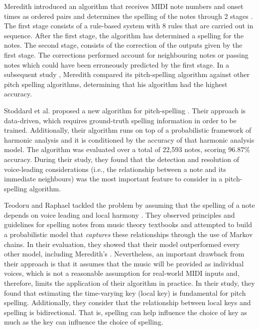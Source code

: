 Meredith introduced an algorithm that receives MIDI note
numbers and onset times as ordered pairs and determines the
spelling of the notes through 2 stages
\parencite{meredith2003pitch}. The first stage consists of a
rule-based system with 8 rules that are carried out in
sequence. After the first stage, the algorithm has
determined a spelling for the notes. The second stage,
consists of the correction of the outputs given by the first
stage. The corrections performed account for neighbouring
notes or passing notes which could have been erroneously
predicted by the first stage. In a subsequent study
\parencite{meredith2005comparing}, Meredith compared its
pitch-spelling algorithm against other pitch spelling
algorithms, determining that his algorithm had the highest
accuracy.



Stoddard et al. proposed a new algorithm for pitch-spelling
\parencite{stoddard2004welltempered}. Their approach is
data-driven, which requires ground-truth spelling
information in order to be trained. Additionally, their
algorithm runs on top of a probabilistic framework of
harmonic analysis \parencite{raphael2003harmonic} and it is
conditioned by the accuracy of that harmonic analysis model.
The algorithm was evaluated over a total of 22,593 notes,
scoring 96.87\% accuracy. During their study, they found
that the detection and resolution of voice-leading
considerations (i.e., the relationship between a note and
its immediate neighbours) was the most important feature to
consider in a pitch-spelling algorithm.

Teodoru and Raphael tackled the problem by assuming that the
spelling of a note depends on voice leading and local
harmony \parencite{teodoru2007pitch}. They observed
principles and guidelines for spelling notes from music
theory textbooks \parencite{aldwell2017harmony,
rimskykorsakov2005practical} and attempted to build a
probabilistic model that \emph{captures} these relationships
through the use of Markov chains. In their evaluation, they
showed that their model outperformed every other model,
including Meredith's \parencite{meredith2006ps13}.
Nevertheless, an important drawback from their approach is
that it assumes that the music will be provided as
individual voices, which is not a reasonable assumption for
real-world MIDI inputs and, therefore, limits the
application of their algorithm in practice. In their study,
they found that estimating the time-varying key (local key)
is fundamental for pitch spelling. Additionally, they
consider that the relationship between local keys and
spelling is bidirectional. That is, spelling can help
influence the choice of key as much as the key can influence
the choice of spelling.
